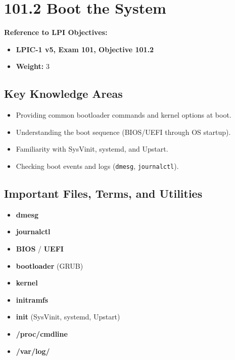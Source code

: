 \documentclass[a4paper]{report}
\begin{document}
\newpage

\section*{101.2 Boot the System}

\textbf{Reference to LPI Objectives:}  
\begin{itemize}
    \item \textbf{LPIC-1 v5, Exam 101, Objective 101.2}
    \item \textbf{Weight:} 3
\end{itemize}

\subsection*{Key Knowledge Areas}
\begin{itemize}
    \item Providing common bootloader commands and kernel options at boot.
    \item Understanding the boot sequence (BIOS/UEFI through OS startup).
    \item Familiarity with SysVinit, systemd, and Upstart.
    \item Checking boot events and logs (\texttt{dmesg}, \texttt{journalctl}).
\end{itemize}

\subsection*{Important Files, Terms, and Utilities}
\begin{itemize}
    \item \textbf{dmesg}
    \item \textbf{journalctl}
    \item \textbf{BIOS} / \textbf{UEFI}
    \item \textbf{bootloader} (GRUB)
    \item \textbf{kernel}
    \item \textbf{initramfs}
    \item \textbf{init} (SysVinit, systemd, Upstart)
    \item \textbf{/proc/cmdline}
    \item \textbf{/var/log/}
\end{itemize}
\end{document}
